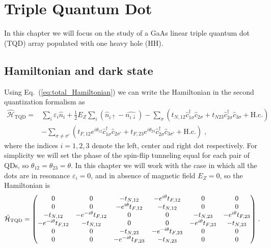 
\chapter{Triple Quantum Dot} %

\label{sec:TQD} %


In this chapter we will focus on the study of a GaAs linear triple quantum dot (TQD) array populated with one heavy hole (HH).
\section{Hamiltonian and dark state}
Using Eq.~(\ref{eq:total_Hamiltonian}) we can write the Hamiltonian in the second quantization formalism as
\begin{equation}
	\begin{split}
	\hat{\mathcal{H}}_{\text{TQD}}=&\sum_i\varepsilon_i\hat{n}_i+\frac{1}{2}E_Z\sum_i(\hat{n}_{i\uparrow}-\hat{{n}_{i\downarrow}})-\sum_{\sigma}(t_{N,12}\hat{c}_{1\sigma}^\dagger \hat{c}_{2\sigma}+t_{N23}\hat{c}_{2\sigma}^\dagger \hat{c}_{3\sigma} + \text{H.c.})\\
	&-\sum_{\sigma\neq \sigma'}(t_{F,12}e^{i\theta_{12}}\hat{c}_{1\sigma}^\dagger \hat{c}_{2\sigma'}+t_{F,23}e^{i\theta_{23}}\hat{c}_{2\sigma}^\dagger \hat{c}_{3\sigma'}+\text{H.c.})\; ,
	\end{split}
\end{equation}
where the indices $i=1,2,3$ denote the left, center and right dot respectively. For simplicity we will set the phase of the spin-flip tunneling equal for each pair of QDs, so $\theta_{12}=\theta_{23}=\theta$. In this chapter we will work with the case in which all the dots are in resonance $\varepsilon_i=0$, and in absence of magnetic field $E_Z=0$, so the Hamiltonian is
\begin{equation}
	\hat{\mathcal{H}}_{\text{TQD}}=\mqty(0 & 0 & -t_{N,12} & -e^{i\theta}t_{F,12} & 0 & 0 \\
	0 & 0 & -e^{i\theta}t_{F,12} & -t_{N,12} & 0 & 0 \\
	-t_{N,12} & -e^{-i\theta}t_{F,12} & 0 & 0 & -t_{N,23} & -e^{i\theta}t_{F,23}\\
	-e^{-i\theta}t_{F,12} & -t_{N,12} & 0 & 0 & -e^{i\theta}t_{F,23} & -t_{N,23}\\
	0 & 0 & -t_{N,23} & -e^{-i\theta}t_{F,23} & 0 & 0 \\
	0 & 0 & -e^{-i\theta}t_{F,23} & -t_{N,23} & 0 & 0)\; .
\end{equation}
